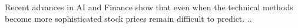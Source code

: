 \label{sec:abstract}
Recent advances in AI and Finance show that even when the technical methods become more sophisticated stock prices remain difficult to predict. ..
